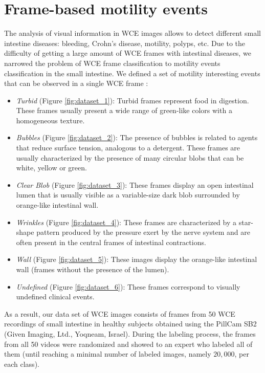 \documentclass[review,12pt,3p]{elsarticle}
\begin{document}
\section{Frame-based motility events}

The analysis of visual information in WCE images allows to detect different small intestine diseases: bleeding, Crohn's disease, motility, polyps, etc. Due to the difficulty of getting a large amount of WCE frames with intestinal diseases, we narrowed the problem of WCE frame classification to motility events classification in the small intestine. We defined a set of motility interesting events that can be observed in a single WCE frame \cite{Malagelada2015}:
\begin{itemize}
\item \emph{Turbid} (Figure \ref{fig:dataset_1}): Turbid frames represent food in digestion. These frames usually present a wide range of green-like colors with a homogeneous texture.
\item \emph{Bubbles} (Figure \ref{fig:dataset_2}): The presence of bubbles is related to agents that reduce surface tension, analogous to a detergent. These frames are usually characterized by the presence of many circular blobs that can be white, yellow or green.
\item \emph{Clear Blob} (Figure \ref{fig:dataset_3}): These frames display an open intestinal lumen that is usually visible as a variable-size dark blob surrounded by orange-like intestinal wall.
\item \emph{Wrinkles} (Figure \ref{fig:dataset_4}): These frames are characterized by a star-shape pattern produced by the pressure exert by the nerve system and are often present in the central frames of intestinal contractions.
\item \emph{Wall} (Figure \ref{fig:dataset_5}): These images display the orange-like intestinal wall (frames without the presence of the lumen).
\item \emph{Undefined} (Figure \ref{fig:dataset_6}): These frames correspond to visually undefined clinical events.
\end{itemize}


As a result, our data set of WCE images consists of frames from 50 WCE recordings of small intestine in healthy subjects obtained using the PillCam SB2 (Given Imaging, Ltd., Yoqneam, Israel). During the labeling process, the frames from all 50 videos were randomized and showed to an expert who labeled all of them (until reaching a minimal number of labeled images, namely $20,000$, per each class).
\end{document}
